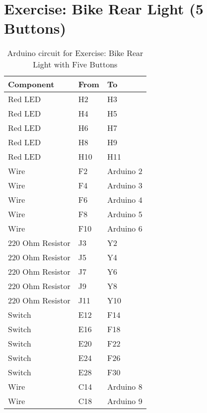\part*{Exercise: Bike Rear Light (5 Buttons)}
\vspace*{-1cm}
\begin{table}[H]
	\centering
	\caption{Arduino circuit for Exercise: Bike Rear Light with Five Buttons}
	\begin{tabular}{|l|l|l|}
		\hline
		Component        & From        & To         \\ \hline
		Red LED          & H2          & H3         \\ \hline
		Red LED          & H4          & H5         \\ \hline
		Red LED          & H6          & H7         \\ \hline
		Red LED          & H8          & H9         \\ \hline
		Red LED          & H10         & H11        \\ \hline
		Wire             & F2          & Arduino 2  \\ \hline
		Wire             & F4          & Arduino 3  \\ \hline
		Wire             & F6          & Arduino 4  \\ \hline
		Wire             & F8          & Arduino 5  \\ \hline
		Wire             & F10         & Arduino 6  \\ \hline
		220 Ohm Resistor & J3          & Y2         \\ \hline
		220 Ohm Resistor & J5          & Y4         \\ \hline
		220 Ohm Resistor & J7          & Y6         \\ \hline
		220 Ohm Resistor & J9          & Y8         \\ \hline
		220 Ohm Resistor & J11         & Y10        \\ \hline
		Switch           & E12         & F14        \\ \hline
		Switch           & E16         & F18        \\ \hline
		Switch           & E20         & F22        \\ \hline
		Switch           & E24         & F26        \\ \hline
		Switch           & E28         & F30        \\ \hline
		Wire             & C14         & Arduino 8  \\ \hline
		Wire             & C18         & Arduino 9  \\ \hline

\end{tabular}
\end{table}
